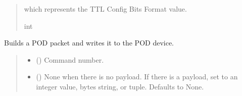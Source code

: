 \documentclass[letterpaper,10pt,english]{sphinxmanual}
\begin{document}
\begin{fulllineitems}
\begin{fulllineitems}
\begin{quote}
\begin{description}
\begin{itemize}
\end{itemize}

\sphinxAtStartPar
which represents the TTL Config Bits Format value.

\sphinxAtStartPar
int

\end{description}\end{quote}

\end{fulllineitems}


\begin{fulllineitems}
\label{\detokenize{PodApi.Devices:PodApi.Devices.PodDevice_8480SC.Pod8480SC.WritePacket}}
\pysigstartsignatures
{}
\pysigstopsignatures
\sphinxAtStartPar
Builds a POD packet and writes it to the POD device.
\begin{quote}\begin{description}
\begin{itemize}
\item {} 
\sphinxAtStartPar
{} (\sphinxstyleliteralemphasis{\sphinxupquote{ | }}) \textendash{} Command number.

\item {} 
\sphinxAtStartPar
{} (\sphinxstyleliteralemphasis{\sphinxupquote{ | }}\sphinxstyleliteralemphasis{\sphinxupquote{ | }}\sphinxstyleliteralemphasis{\sphinxupquote{{[}}}\sphinxstyleliteralemphasis{\sphinxupquote{ | }}\sphinxstyleliteralemphasis{\sphinxupquote{{]}}}\sphinxstyleliteralemphasis{\sphinxupquote{, }}) \textendash{} None when there is no payload. If there                 is a payload, set to an integer value, bytes string, or tuple. Defaults to None.


\end{itemize}
\end{description}
\end{quote}
\end{fulllineitems}
\end{fulllineitems}
\end{document}

